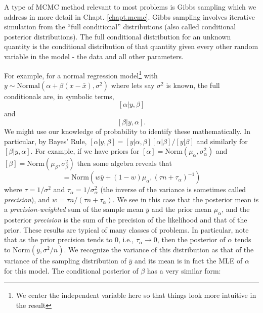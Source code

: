 A type of MCMC method relevant to most problems is Gibbs sampling 
\citep{geman_geman:1984} which we address in more detail in Chapt. \ref{chapt.mcmc}.
Gibbs sampling 
involves 
iterative simulation from the ``full
conditional'' 
distributions (also called conditional posterior
distributions). The full conditional distribution for an unknown
quantity is the conditional distribution of that quantity given every
other random variable in the model - the data and all other
parameters. 
For example, for a normal regression model\footnote{We center the 
independent variable here so that things look more intuitive in the result} with $y \sim
\mbox{Normal}(\alpha + \beta (x-\bar{x}) , \sigma^{2})$
where lets say $\sigma^{2}$ is known, the full conditionals are, in symbolic terms,
\[
[\alpha|y,\beta]
\]
 and
\[
[\beta|y,\alpha].
\]
We might use our knowledge of probability to identify these
mathematically. In particular, by Bayes' Rule, $[\alpha|y,\beta] =
[y|\alpha,\beta][\alpha|\beta]/[y|\beta]$ and similarly for
$[\beta|y,\alpha]$. For example, if we have priors for 
$[\alpha] = \mbox{Norm}(\mu_{\alpha}, \sigma^{2}_{\alpha})$ 
and 
$[\beta] = \mbox{Norm}(\mu_{\beta}, \sigma^{2}_{\beta})$ then
some algebra reveals that 
\begin{equation}
[\alpha|y,\beta] = \mbox{Norm}\left(w \bar{y} + (1-w)\mu_{\alpha},
(\tau n + \tau_{\alpha})^{-1} \right)
\label{glms.eq.alpha}
\end{equation}
where $\tau = 1/\sigma^{2}$ and $\tau_{\alpha} = 1/\sigma^{2}_{\alpha}$
(the inverse of the variance is sometimes called {\it precision}), and
$w = \tau n/(\tau n + \tau_{\alpha})$. We see in this case that the
posterior mean is a {\it precision-weighted} sum of the sample mean
$\bar{y}$ and the prior mean $\mu_{\alpha}$, and the posterior {\it precision} 
is the sum of the precision of the likelihood and that of the
prior. These results are typical of many
classes of problems. In particular, note that as the prior precision
tends to 0, i.e., $\tau_{\alpha} \rightarrow 0$, then the posterior of
$\alpha$ tends to  $\mbox{Norm}(\bar{y}, \sigma^{2}/n)$. We recognize the 
variance of this distribution as that of the variance of the sampling
distribution of $\bar{y}$ and its mean is in fact the MLE of $\alpha$
for this model. 
The conditional posterior of $\beta$ has a very similar form:
